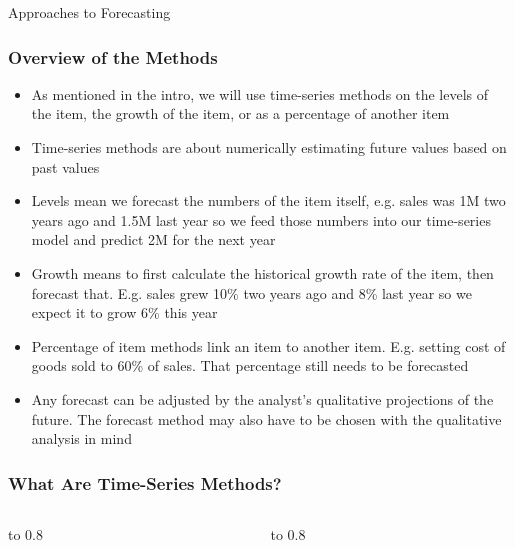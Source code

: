 \documentclass[handout, 11pt]{beamer}
\begin{document}
\begin{section}{Approaches to Forecasting}
\begin{frame}
\frametitle{Overview of the Methods}
\begin{itemize}
\small
\vfill
\item As mentioned in the intro, we will use time-series methods on the levels of the item, the growth of the item, or as a percentage of another item
\vfill
\item Time-series methods are about numerically estimating future values based on past values
\vfill
\item Levels mean we forecast the numbers of the item itself, e.g. sales was 1M two years ago and 1.5M last year so we feed those numbers into our time-series model and predict 2M for the next year
\vfill
\item Growth means to first calculate the historical growth rate of the item, then forecast that. E.g. sales grew 10\% two years ago and 8\% last year so we expect it to grow 6\% this year
\vfill
\item Percentage of item methods link an item to another item. E.g. setting cost of goods sold to 60\% of sales. That percentage still needs to be forecasted
\vfill
\item Any forecast can be adjusted by the analyst's qualitative projections of the future. The forecast method may also have to be chosen with the qualitative analysis in mind
\end{itemize}
\end{frame}
\begin{frame}
\frametitle{What Are Time-Series Methods?}
\begin{columns}
\begin{column}{0.5\textwidth}
\vbox to 0.8
\end{column}
\begin{column}{0.5\textwidth}
\vbox to 0.8
\end{column}
\end{columns}
\end{frame}
\end{section}
\end{document}

